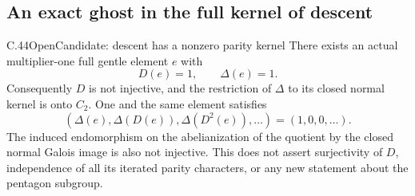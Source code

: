 \subsection{An exact ghost in the full kernel of descent}

\begin{statement}{C.44}{Open}{Candidate: descent has a nonzero parity kernel}
There exists an actual multiplier-one full gentle element $e$ with
\[
             D(e)=1,\qquad \Delta(e)=1.                 \tag{C.44.1}
\]
Consequently $D$ is not injective, and the restriction of $\Delta$
to its closed normal kernel is onto $C_2$. One and the same element
satisfies
\[
       (\Delta(e),\Delta(D(e)),\Delta(D^2(e)),\ldots)
                         =(1,0,0,\ldots).              \tag{C.44.2}
\]
The induced endomorphism on the abelianization of the quotient by
the closed normal Galois image is also not injective. This does not
assert surjectivity of $D$, independence of all its iterated parity
characters, or any new statement about the pentagon subgroup.
\end{statement}

